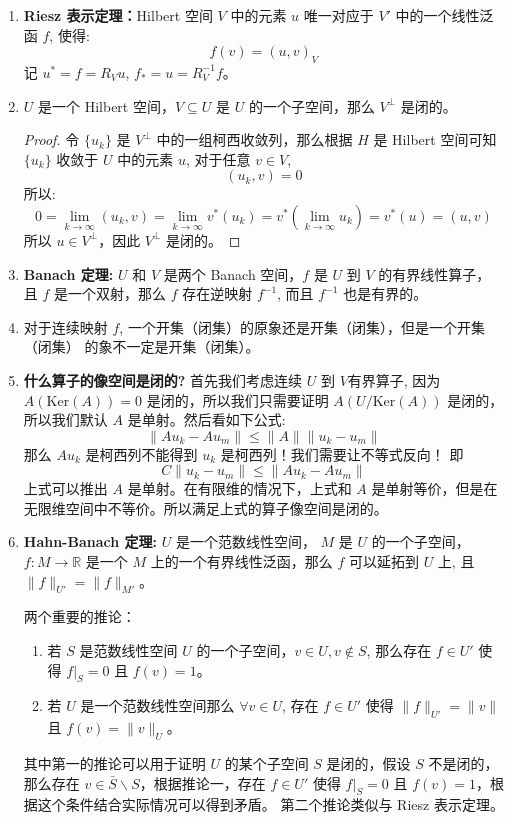 \documentclass[lang=cn,a4paper,newtx]{elegantpaper}
\begin{document}
\begin{enumerate}
\item \textbf{Riesz 表示定理：}Hilbert 空间 $V$ 中的元素 $u$ 唯一对应于 $V'$ 
    中的一个线性泛函 $f$, 使得:
    $$ 
    f(v) = (u, v)_{V} 
    $$ 
    记 $u^* = f = R_Vu$, $f_* = u = R_V^{-1}f$。

\item $U$ 是一个 Hilbert 空间，$V \subseteq U$ 是 $U$ 的一个子空间，那么
    $V^{\perp}$ 是闭的。
    \begin{proof}
        令 $\{u_k\}$ 是 $V^{\perp}$ 中的一组柯西收敛列，那么根据 $H$ 是 Hilbert
        空间可知 $\{u_k\}$ 收敛于 $U$ 中的元素 $u$, 对于任意 $v \in V$,
        $$
        (u_k, v) = 0
        $$
        所以:
        $$
        0 = \lim_{k\to\infty}(u_k, v) = \lim_{k\to\infty}v^*(u_k) =
        v^*(\lim_{k\to\infty} u_k) = v^*(u) = (u, v)
        $$
        所以 $u \in V^{\perp}$，因此 $V^{\perp}$ 是闭的。
    \end{proof}

\item \textbf{Banach 定理:} $U$ 和 $V$ 是两个 Banach 空间，$f$ 是 $U$ 到 $V$
    的有界线性算子，且 $f$ 是一个双射，那么 $f$ 存在逆映射 $f^{-1}$, 而且 $f^{-1}$
    也是有界的。

\item 对于连续映射 $f$, 一个开集（闭集）的原象还是开集（闭集），但是一个开集（闭集）
    的象不一定是开集（闭集）。

\item \textbf{什么算子的像空间是闭的?} 首先我们考虑连续 $U$ 到 $V$有界算子,
    因为 $A(\mathrm{Ker}(A))=0$ 是闭的，所以我们只需要证明
    $A(U/\mathrm{Ker}(A))$ 是闭的，所以我们默认 $A$ 是单射。然后看如下公式:
    $$
    \|Au_k-Au_m\|\leq \|A\|\|u_k-u_m\|
    $$
    那么 $Au_k$ 是柯西列不能得到 $u_k$ 是柯西列！我们需要让不等式反向！
    即 
    $$
    C\|u_k-u_m\|\leq \|Au_k-Au_m\|
    $$
    上式可以推出 $A$ 是单射。在有限维的情况下，上式和 $A$
    是单射等价，但是在无限维空间中不等价。所以满足上式的算子像空间是闭的。

\item \textbf{Hahn-Banach 定理:} $U$ 是一个范数线性空间，
    $M$ 是 $U$ 的一个子空间，
    $f: M \to \mathbb{R}$ 是一个 $M$ 上的一个有界线性泛函，那么 $f$ 可以延拓到
    $U$ 上, 且 $\|f\|_{U'} = \|f\|_{M'}$。
    \begin{note}
        两个重要的推论：
        \begin{enumerate}
            \item 若 $S$ 是范数线性空间 $U$ 的一个子空间，$v\in U, v\notin S$,
                那么存在 $f\in U'$ 使得 $f|_S = 0$ 且 $f(v) = 1$。
            \item 若 $U$ 是一个范数线性空间那么 $\forall v \in U$,
                存在 $f\in U'$ 使得 $\|f\|_{U'} = \|v\|$ 且 $f(v) = \|v\|_U$。 
        \end{enumerate}
        其中第一的推论可以用于证明 $U$ 的某个子空间 $S$ 是闭的，假设 $S$ 不是闭的，
        那么存在 $v\in \bar{S}\backslash S$，根据推论一，存在 $f\in U'$ 使得
        $f|_S = 0$ 且 $f(v) = 1$，根据这个条件结合实际情况可以得到矛盾。
        第二个推论类似与 Riesz 表示定理。
    \end{note}


\end{enumerate}
\end{document}
